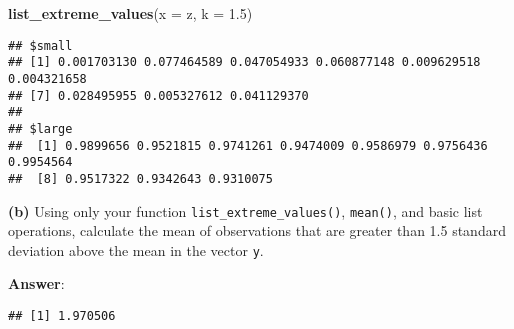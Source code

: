 \documentclass[]{article}
\newenvironment{Shaded}{\begin{snugshade}}{\end{snugshade}}
\newcommand{\KeywordTok}[1]{\textcolor[rgb]{0.13,0.29,0.53}{\textbf{#1}}}
\newcommand{\DataTypeTok}[1]{\textcolor[rgb]{0.13,0.29,0.53}{#1}}
\newcommand{\FloatTok}[1]{\textcolor[rgb]{0.00,0.00,0.81}{#1}}
\newcommand{\OperatorTok}[1]{\textcolor[rgb]{0.81,0.36,0.00}{\textbf{#1}}}
\newcommand{\NormalTok}[1]{#1}
\begin{document}
\begin{Shaded}
\begin{Highlighting}[]
\KeywordTok{list_extreme_values}\NormalTok{(}\DataTypeTok{x =}\NormalTok{ z, }\DataTypeTok{k =} \FloatTok{1.5}\NormalTok{)}
\end{Highlighting}
\end{Shaded}

\begin{verbatim}
## $small
## [1] 0.001703130 0.077464589 0.047054933 0.060877148 0.009629518 0.004321658
## [7] 0.028495955 0.005327612 0.041129370
## 
## $large
##  [1] 0.9899656 0.9521815 0.9741261 0.9474009 0.9586979 0.9756436 0.9954564
##  [8] 0.9517322 0.9342643 0.9310075
\end{verbatim}

\textbf{(b)} Using only your function \texttt{list\_extreme\_values()},
\texttt{mean()}, and basic list operations, calculate the mean of
observations that are greater than 1.5 standard deviation above the mean
in the vector \texttt{y}.

\textbf{Answer}:

\begin{Shaded}
\end{Shaded}

\begin{verbatim}
## [1] 1.970506
\end{verbatim}
\end{document}
